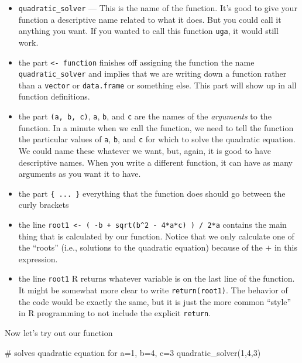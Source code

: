 \documentclass[
  letterpaper,
  DIV=11,
  numbers=noendperiod]{scrreprt}
\newenvironment{Shaded}{\begin{snugshade}}{\end{snugshade}}
\newcommand{\CommentTok}[1]{\textcolor[rgb]{0.37,0.37,0.37}{#1}}
\newcommand{\DecValTok}[1]{\textcolor[rgb]{0.68,0.00,0.00}{#1}}
\newcommand{\FunctionTok}[1]{\textcolor[rgb]{0.28,0.35,0.67}{#1}}
\newcommand{\NormalTok}[1]{\textcolor[rgb]{0.00,0.23,0.31}{#1}}
\begin{document}
\begin{itemize}
\item
  \texttt{quadratic\_solver} --- This is the name of the function. It's
  good to give your function a descriptive name related to what it does.
  But you could call it anything you want. If you wanted to call this
  function \texttt{uga}, it would still work.
\item
  the part \texttt{\textless{}-\ function} finishes off assigning the
  function the name \texttt{quadratic\_solver} and implies that we are
  writing down a function rather than a \texttt{vector} or
  \texttt{data.frame} or something else. This part will show up in all
  function definitions.
\item
  the part \texttt{(a,\ b,\ c)}, \texttt{a}, \texttt{b}, and \texttt{c}
  are the names of the \emph{arguments} to the function. In a minute
  when we call the function, we need to tell the function the particular
  values of \texttt{a}, \texttt{b}, and \texttt{c} for which to solve
  the quadratic equation. We could name these whatever we want, but,
  again, it is good to have descriptive names. When you write a
  different function, it can have as many arguments as you want it to
  have.
\item
  the part \texttt{\{\ ...\ \}} everything that the function does should
  go between the curly brackets
\item
  the line
  \texttt{root1\ \textless{}-\ (\ -b\ +\ sqrt(b\^{}2\ -\ 4*a*c)\ )\ /\ 2*a}
  contains the main thing that is calculated by our function. Notice
  that we only calculate one of the ``roots'' (i.e., solutions to the
  quadratic equation) because of the \(+\) in this expression.
\item
  the line \texttt{root1} R returns whatever variable is on the last
  line of the function. It might be somewhat more clear to write
  \texttt{return(root1)}. The behavior of the code would be exactly the
  same, but it is just the more common ``style'' in R programming to not
  include the explicit \texttt{return}.
\end{itemize}

Now let's try out our function

\begin{Shaded}
\begin{Highlighting}[]
\CommentTok{\# solves quadratic equation for a=1, b=4, c=3}
\FunctionTok{quadratic\_solver}\NormalTok{(}\DecValTok{1}\NormalTok{,}\DecValTok{4}\NormalTok{,}\DecValTok{3}\NormalTok{)}
\end{Highlighting}
\end{Shaded}
\end{document}
